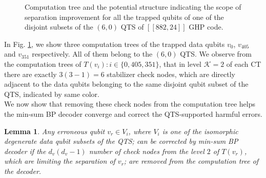 \documentclass[%
 reprint,
 amsmath,amssymb,
 aps,
pra,
showkeys,
]{revtex4-2}
\newtheorem{lemma}{Lemma}
\begin{document}
\begin{figure}[t]
{{}}

\caption{Computation tree and the potential structure indicating the scope of separation improvement for all the trapped qubits of one of the disjoint subsets of the $(6,0)$ QTS of $[[882,24]]$ GHP code.}
\label{fig:ct-qts60}
\end{figure}
In Fig. \ref{fig:ct-qts60}, we show three computation trees of the trapped data qubits $v_0$, $v_{405}$ and $v_{351}$ respectively.
All of them belong to the $(6,0)$ QTS.
We observe from the computation trees of $T(v_i) : i \in \{0, 405, 351\}$, that in level $\mathcal{K}=2$ of each CT there are exactly $3(3-1) = 6$ stabilizer check nodes, which are directly adjacent to the data qubits belonging to the same disjoint qubit subset of the QTS, indicated by same color.\\
We now show that removing these check nodes from the computation tree helps the min-sum BP decoder converge and correct the QTS-supported harmful errors.
\begin{lemma}
    Any erroneous qubit $v_r \in V_i$, where $V_i$ is one of the isomorphic degenerate data qubit subsets of the QTS; can be corrected by \textit{min-sum} BP decoder if the $d_v(d_v-1)$ number of check nodes from the level $2$ of $T(v_r)$, which are limiting the separation of $v_r$; are removed from the computation tree of the decoder.
    \label{cor:sep-imp-rem-chk}
\end{lemma}
\end{document}
